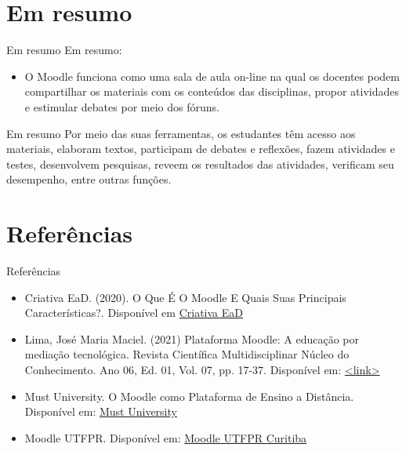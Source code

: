 \documentclass[11pt]{beamer}
\begin{document}
\section{Em resumo}
	\begin{frame}{Em resumo}
		\justifying Em resumo:
		\begin{itemize}
			\justifying
			\item O Moodle funciona como uma sala de aula on-line na qual os docentes podem compartilhar os materiais com os conteúdos das disciplinas, propor atividades e estimular debates por meio dos fóruns.
			
			
		
		\end{itemize}
	\end{frame}
	
	\begin{frame}{Em resumo}
		\justifying 
		Por meio das suas ferramentas, os estudantes têm acesso aos materiais, elaboram textos, participam de debates e reflexões, fazem atividades e testes, desenvolvem pesquisas, reveem os resultados das atividades, verificam seu desempenho, entre outras funções.
	
	\end{frame}
	
\section{Referências}
	\begin{frame}{Referências}
		\begin{itemize}
			\item Criativa EaD. (2020). O Que É O Moodle E Quais Suas Principais Características?. Disponível em  \href{https://bit.ly/amvb894hg}{Criativa EaD}
			\item Lima, José Maria Maciel. (2021) Plataforma Moodle: A educação por mediação tecnológica. Revista Científica Multidisciplinar Núcleo do Conhecimento. Ano 06, Ed. 01, Vol. 07, pp. 17-37. Disponível em: \href{https://bit.ly/9mb7b2}{<link>} 
			\item Must University. O Moodle como Plataforma de Ensino a Distância. Disponível em: \href{https://edu612tema19v2pt.webflow.io/}{Must University} 
			\item Moodle UTFPR. Disponível em: \href{https://moodle.utfpr.edu.br/login/index.php}{Moodle UTFPR Curitiba}
		\end{itemize}
	\end{frame}
\end{document}
